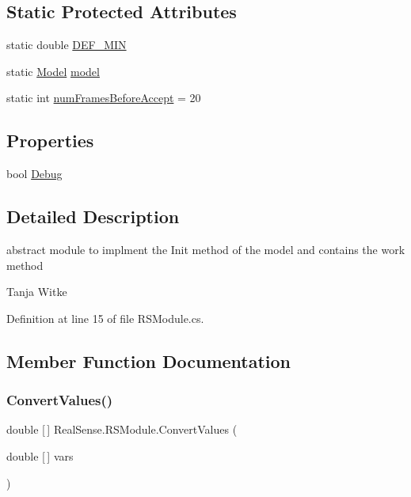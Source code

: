 \subsection*{Static Protected Attributes}
\begin{DoxyCompactItemize}
\item 
static double \hyperlink{class_real_sense_1_1_r_s_module_a157703aadbac7416f5fc0eb339546002}{D\+E\+F\+\_\+\+M\+IN}
\item 
static \hyperlink{class_real_sense_1_1_model}{Model} \hyperlink{class_real_sense_1_1_r_s_module_a29ce0491f4813a62b998effa782423d1}{model}
\item 
static int \hyperlink{class_real_sense_1_1_r_s_module_a9a8c8d17ca9321b558c50f2458a90f3c}{num\+Frames\+Before\+Accept} = 20
\end{DoxyCompactItemize}
\subsection*{Properties}
\begin{DoxyCompactItemize}
\item 
bool \hyperlink{class_real_sense_1_1_r_s_module_a89c9c568ab387b183a63ed2755a82203}{Debug}
\end{DoxyCompactItemize}


\subsection{Detailed Description}
abstract module to implment the Init method of the model and contains the work method

Tanja Witke 

Definition at line 15 of file R\+S\+Module.\+cs.



\subsection{Member Function Documentation}
\mbox{\label{class_real_sense_1_1_r_s_module_a53505c9cb3af67e42a0710fdfad65ae5}} 
\subsubsection{\texorpdfstring{Convert\+Values()}{ConvertValues()}}
{\footnotesize\ttfamily double \mbox{[}$\,$\mbox{]} Real\+Sense.\+R\+S\+Module.\+Convert\+Values (\begin{DoxyParamCaption}\item[{double \mbox{[}$\,$\mbox{]}}]{vars }\end{DoxyParamCaption})\hspace{0.3cm}{\ttfamily [protected]}}

